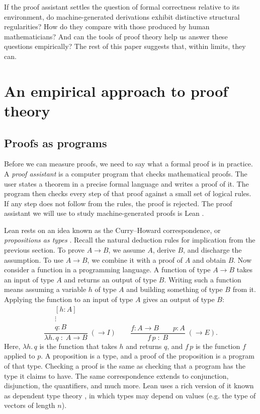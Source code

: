\documentclass{article}
\begin{document}
If the proof assistant settles the question of formal correctness relative to its 
environment, do machine-generated derivations exhibit distinctive structural regularities? How do they compare with those 
produced by human mathematicians? And can the tools of proof theory help us answer these questions empirically? The rest of this
paper suggests that, within limits, they can.

\section{An empirical approach to proof theory}
\subsection{Proofs as programs}
Before we can measure proofs, we need to say what a formal proof is in practice. A \textit{proof assistant} is a computer
program that checks mathematical proofs. The user states a theorem in a precise formal language and writes a proof
of it. The program then checks every step of that proof against a small set of logical rules. If any step does not
follow from the rules, the proof is rejected. The proof assistant we will use to study machine-generated proofs is Lean \textit{\parencite{demoura2021lean4}}.

Lean rests on an idea known as the Curry--Howard correspondence, or \textit{propositions as types} \textit{\parencite{curry1958,howard1980}}. Recall the
natural deduction rules for implication from the previous section. To prove $A\to B$, we assume $A$, derive $B$, and
discharge the assumption. To use $A\to B$, we combine it with a proof of $A$ and obtain $B$. Now consider a function
in a programming language. A function of type $A\to B$ takes an input of type $A$ and returns an output of type $B$.
Writing such a function means assuming a variable $h$ of type $A$ and building something of type $B$ from it. Applying
the function to an input of type $A$ gives an output of type $B$:
\[
\frac{
  \begin{array}{c}
  [h:A]\\
  \vdots\\
  q:B
  \end{array}
}{
  \lambda h.\,q\;:\;A\to B
}\;(\to I)
\qquad
\frac{f:A\to B\qquad p:A}{f\,p\;:\;B}\;(\to E).
\]
Here, $\lambda h.\,q$ is the function that takes $h$ and returns $q$, and $f\,p$ is the function $f$ applied to $p$.
A proposition is a type, and a proof of the proposition is a program of that type. Checking a proof is the same as
checking that a program has the type it claims to have. The same correspondence extends to conjunction, disjunction,
the quantifiers, and much more. Lean uses a rich version of it known as dependent type theory \textit{\parencite{coquand1988}}, in which types may
depend on values (e.g. the type of vectors of length $n$).
\end{document}
